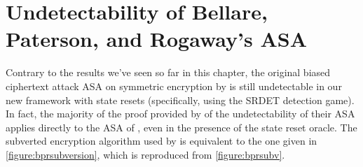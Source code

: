 \section{Undetectability of Bellare, Paterson, and Rogaway's ASA} \label{sec:bpranalysis}

Contrary to the results we've seen so far in this chapter, the original biased ciphertext attack ASA on symmetric encryption by \cite{C:BelPatRog14} is still undetectable in our new framework with state resets (specifically, using the SRDET detection game). In fact, the majority of the proof provided by \cite{CCS:BelJaeKan15} of the undetectability of their ASA applies directly to the ASA of \cite{C:BelPatRog14}, even in the presence of the state reset oracle. The subverted encryption algorithm used by \cite{C:BelPatRog14} is equivalent to the one given in \autoref{figure:bprsubversion}, which is reproduced from \autoref{figure:bprsubv}.


